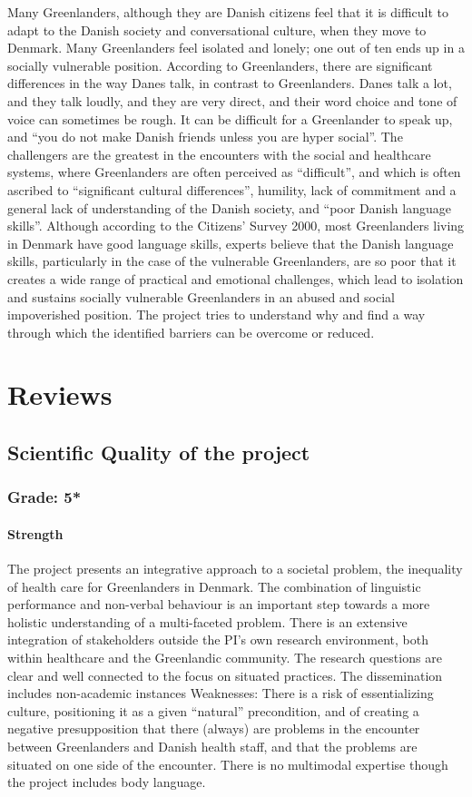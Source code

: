 \documentclass[twocolumn, serif, rga, authordate]{jote-article}
\begin{document}
Many Greenlanders, although they are Danish citizens feel that it is difficult to adapt to the Danish society and conversational culture, when they move to Denmark. Many Greenlanders feel isolated and lonely;
one out of ten ends up in a socially vulnerable position. According to Greenlanders, there are significant differences in the way Danes talk, in contrast to Greenlanders. Danes talk a lot, and they talk loudly, and they are very direct, and their word choice and tone of voice can sometimes be rough. It can be difficult for a Greenlander to speak up, and ``you do not make Danish friends unless you are hyper social''. The challengers are the greatest in the encounters with the social and healthcare systems, where Greenlanders are often perceived as
``difficult'', and which is often ascribed to ``significant cultural differences'', humility, lack of commitment and a general lack of understanding of the Danish society, and ``poor Danish language skills''. Although according to the Citizens' Survey 2000, most Greenlanders living in Denmark have good language skills, experts believe that the Danish language skills, particularly in the case of the vulnerable Greenlanders, are so poor that it creates a wide range of practical and emotional challenges, which lead to isolation and sustains socially vulnerable Greenlanders in an abused and social impoverished position. The project tries to understand why and find a way through which the identified barriers can be overcome or reduced.


\section*{Reviews}


\subsection*{Scientific Quality of the project}
\subsubsection*{Grade: 5*}

\paragraph{Strength}
The project presents an integrative approach to a societal problem, the inequality of health care for Greenlanders in Denmark. The combination of linguistic performance and non-verbal behaviour is an important step towards a more holistic understanding of a multi-faceted problem. There is an extensive integration of stakeholders outside the PI's own research environment, both within healthcare and the Greenlandic community. The research questions are clear and well connected to the focus on situated practices. The dissemination includes non-academic instances Weaknesses: There is a risk of essentializing culture, positioning it as a given ``natural'' precondition, and of creating a negative presupposition that there (always) are problems in the encounter between Greenlanders and Danish health staff, and that the problems are situated on one side of the encounter. There is no multimodal expertise though the project includes body language.
\end{document}

